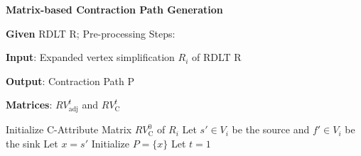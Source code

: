 \newpage
 
\begin{algorithm}[H]
\caption{\textbf{Matrix-based Contraction Path Generation}}
\label{alg:contractionPathGeneration}
\textbf{Given} RDLT R; Pre-processing Steps:

\textbf{Input}: Expanded vertex simplification $R_i$ of RDLT R

\textbf{Output}: Contraction Path P

\textbf{Matrices}: $RV^{t}_{\text{adj}}$ and $RV^{t}_{\text{C}}$

    \begin{algorithmic}[1]

    \State Initialize C-Attribute Matrix $RV^{0}_{\text{C}}$ of $R_i$
    \State Let $s' \in V_i$ be the source and $f' \in V_i$ be the sink
    \State Let $x = s'$
    \State Initialize $P = \{x\}$
    \State Let $t = 1$



\end{algorithmic}
\end{algorithm}

